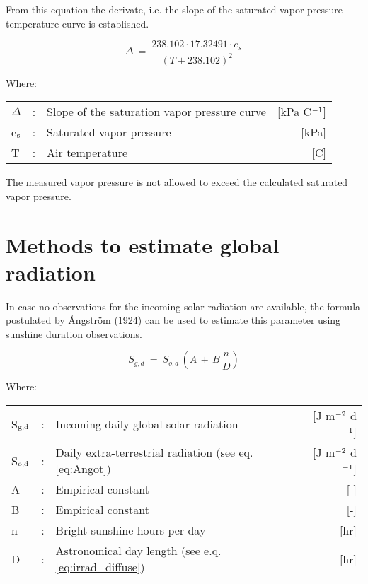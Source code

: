 From this equation the derivate, i.e. the slope of the saturated vapor pressure-temperature
curve is established.

\begin{equation}
\label{eq:SlopeSVP}
\Delta ~=~{\frac{238.102 \cdot 17.32491 \cdot e_{s} }{(T + 238.102)^{2} }}
\end{equation}

Where:\\[5pt]
\begin{tabularx}{\textwidth}{llXr}
	$\Delta$ &:& Slope of the saturation vapor pressure curve  & [kPa \degrees C$^{{\rm -1}}$]\\
	e$_{{\rm s}}$ &:& Saturated vapor pressure &  [kPa]\\
	T &:& Air temperature & [\degrees C]
\end{tabularx}

The measured vapor pressure is not allowed to exceed the calculated saturated vapor
pressure.

\section{Methods to estimate global radiation}

In case no observations for the incoming solar radiation are available, the formula
postulated by \AA ngstr\"{o}m (1924) can be used to estimate this parameter using sunshine
duration observations.

\begin{equation}
\label{eq:GlobRad}
S _{g,d} ~=~S _{o,d} \, (A\, +\, B\,{\frac{n}{D}} )
\end{equation}

Where:\\[5pt]
\begin{tabularx}{\textwidth}{llXr}
	S$_{{\rm g,d}}$ &:& Incoming daily global solar radiation  & [J m$^{{\rm -2}}$ d$^{{\rm -1}}$]\\
	S$_{{\rm o,d}}$ &:& Daily extra-terrestrial radiation (see eq. \ref{eq:Angot}) 
	& [J m$^{{\rm -2}}$ d$^{{\rm -1}}$]\\
	A &:& Empirical constant  & [-]\\
	B &:& Empirical constant  & [-]\\
	n &:& Bright sunshine hours per day  & [hr]\\
	D &:& Astronomical day length (see e.q. \ref{eq:irrad_diffuse})  & [hr]
\end{tabularx}

